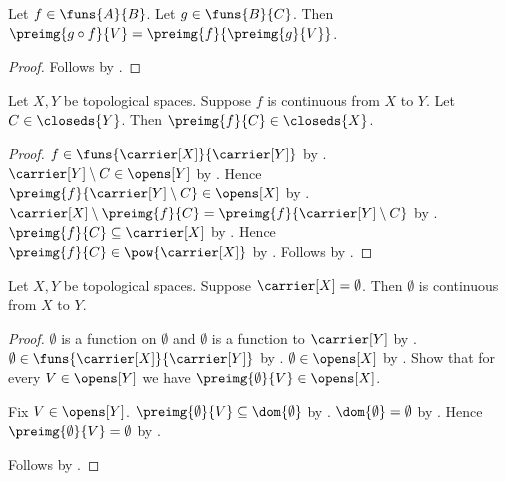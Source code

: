 \begin{lemma}\label{preimage_composition}
    Let $f\in\funs{A}{B}$.
    Let $g\in\funs{B}{C}$.
    Then
        $\preimg{g\circ f}{V}
            =\preimg{f}{\preimg{g}{V}}$.
\end{lemma}
\begin{proof}
    Follows by .
\end{proof}

\begin{theorem}\label{continuous_preimage_closed}
    Let $X,Y$ be topological spaces.
    Suppose $f$ is continuous from $X$ to $Y$.
    Let $C\in\closeds{Y}$.
    Then $\preimg{f}{C}\in\closeds{X}$.
\end{theorem}
\begin{proof}
    $f\in\funs{\carrier[X]}{\carrier[Y]}$
        by .
    $\carrier[Y]\setminus C\in\opens[Y]$ by .
    Hence $\preimg{f}{\carrier[Y]\setminus C}\in\opens[X]$
        by .
    $\carrier[X]\setminus\preimg{f}{C}
        =\preimg{f}{\carrier[Y]\setminus C}$
        by .
    $\preimg{f}{C}\subseteq\carrier[X]$
        by .
    Hence $\preimg{f}{C}\in\pow{\carrier[X]}$
        by .
    Follows by .
\end{proof}

\begin{theorem}\label{empty_function_continuous}
    Let $X,Y$ be topological spaces.
    Suppose $\carrier[X]=\emptyset$.
    Then $\emptyset$ is continuous from $X$ to $Y$.
\end{theorem}
\begin{proof}
    $\emptyset$ is a function on $\emptyset$ and
        $\emptyset$ is a function to $\carrier[Y]$ by
        .
    $\emptyset\in\funs{\carrier[X]}{\carrier[Y]}$ by .
    $\emptyset\in\opens[X]$ by .
    Show that for every $V\in\opens[Y]$ we have
        $\preimg{\emptyset}{V}\in\opens[X]$.
    \begin{subproof}
        Fix $V\in\opens[Y]$.
        $\preimg{\emptyset}{V}\subseteq\dom{\emptyset}$ by
            .
        $\dom{\emptyset}=\emptyset$ by .
        Hence $\preimg{\emptyset}{V}=\emptyset$ by .
    \end{subproof}
    Follows by .
\end{proof}

